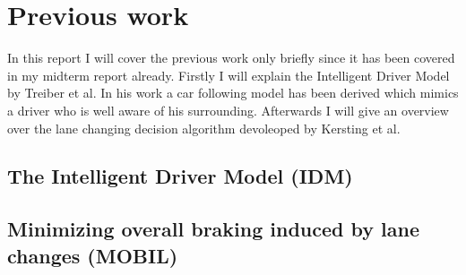 \section{Previous work}
\label{sec:previous_work}
In this report I will cover the previous work only briefly since it has been covered in my midterm report already.
Firstly I will explain the Intelligent Driver Model by Treiber et al. In his work a car following model has been derived
which mimics a driver who is well aware of his surrounding. Afterwards I will give an overview over the lane changing
decision algorithm devoleoped by Kersting et al.

\subsection{The Intelligent Driver Model (IDM)}
\label{sec:idm}

\subsection{Minimizing overall braking induced by lane changes (MOBIL)}
\label{sec:mobil}
